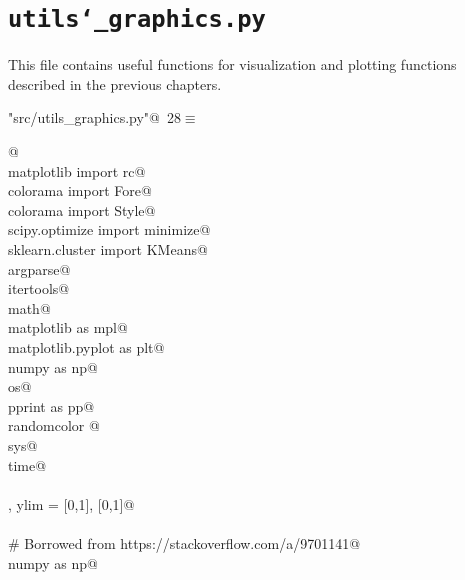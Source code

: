 \documentclass[10pt, english, oneside]{report}
\begin{document}
\begin{appendices}
\begin{flushleft}
\begin{list}{}{\setlength{\itemsep}{-\parsep}\setlength{\itemindent}{-\leftmargin}}
\item{}
\end{list}
\vspace{4ex}
\end{flushleft}
\chapter{\texttt{utils\char`_graphics.py}}

This file contains useful functions for visualization and plotting functions described in the previous chapters.
\begin{flushleft} \small\label{scrap31}\raggedright\small
{} \verb@"src/utils_graphics.py"@\nobreak\ {\footnotesize {28}}$\equiv$
\vspace{-1ex}
\begin{list}{}{} \item
\mbox{}\verb@    @\\
\mbox{}\verb@from matplotlib import rc@\\
\mbox{}\verb@from colorama import Fore@\\
\mbox{}\verb@from colorama import Style@\\
\mbox{}\verb@from scipy.optimize import minimize@\\
\mbox{}\verb@from sklearn.cluster import KMeans@\\
\mbox{}\verb@import argparse@\\
\mbox{}\verb@import itertools@\\
\mbox{}\verb@import math@\\
\mbox{}\verb@import matplotlib as mpl@\\
\mbox{}\verb@import matplotlib.pyplot as plt@\\
\mbox{}\verb@import numpy as np@\\
\mbox{}\verb@import os@\\
\mbox{}\verb@import pprint as pp@\\
\mbox{}\verb@import randomcolor @\\
\mbox{}\verb@import sys@\\
\mbox{}\verb@import time@\\
\mbox{}\verb@@\\
\mbox{}\verb@xlim, ylim = [0,1], [0,1]@\\
\mbox{}\verb@@\\
\mbox{}\verb@# Borrowed from https://stackoverflow.com/a/9701141@\\
\mbox{}\verb@import numpy as np@\\

\end{list}
\end{flushleft}
\end{appendices}
\end{document}

